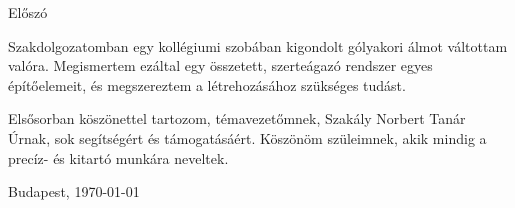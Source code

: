 \documentclass[../main.tex]{subfiles}
\begin{document}
{\Large{Előszó}}


Szakdolgozatomban egy kollégiumi szobában kigondolt gólyakori álmot váltottam valóra. Megismertem ezáltal egy összetett, szerteágazó rendszer egyes építőelemeit, és megszereztem a létrehozásához szükséges tudást. 

Elsősorban köszönettel tartozom, témavezetőmnek, Szakály Norbert Tanár Úrnak, sok segítségért és támogatásáért.
Köszönöm szüleimnek, akik mindig a precíz- és kitartó munkára neveltek.

Budapest, \today

\myname
\end{document}
